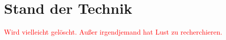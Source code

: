 \chapter{Stand der Technik}
\label{ch:StandDerTechnik}

\textcolor{red}{Wird vielleicht gelöscht. Außer irgendjemand hat Lust zu recherchieren.}